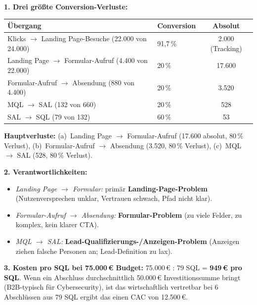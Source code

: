 \documentclass[11pt,a4paper,oneside]{article}
\begin{document}
\begin{loesungbox}
\textbf{1. Drei größte Conversion-Verluste:}

\smallskip
\begin{tabularx}{\linewidth}{@{}lXc@{}}
\toprule
\textbf{Übergang} & \textbf{Conversion} & \textbf{Absolut} \\
\midrule
Klicks $\rightarrow$ Landing Page-Besuche (22.000 von 24.000) & 91,7\,\% & \textendash{}2.000 (Tracking) \\
\midrule
Landing Page $\rightarrow$ Formular-Aufruf (4.400 von 22.000) & 20\,\% & \textendash{}17.600 \\
\midrule
Formular-Aufruf $\rightarrow$ Absendung (880 von 4.400)     & 20\,\% & \textendash{}3.520 \\
\midrule
MQL $\rightarrow$ SAL (132 von 660)                        & 20\,\% & \textendash{}528 \\
\midrule
SAL $\rightarrow$ SQL (79 von 132)                         & 60\,\% & \textendash{}53 \\
\bottomrule
\end{tabularx}

\smallskip
\textbf{Hauptverluste:} (a)~Landing Page $\rightarrow$ Formular-Aufruf (\textendash{}17.600 absolut, 80\,\% Verlust), (b)~Formular-Aufruf $\rightarrow$ Absendung (\textendash{}3.520, 80\,\% Verlust), (c)~MQL $\rightarrow$ SAL (\textendash{}528, 80\,\% Verlust).

\textbf{2. Verantwortlichkeiten:}
\begin{itemize}
  \item \emph{Landing Page $\rightarrow$ Formular:} primär \textbf{Landing-Page-Problem} (Nutzenversprechen unklar, Vertrauen schwach, Pfad nicht klar).
  \item \emph{Formular-Aufruf $\rightarrow$ Absendung:} \textbf{Formular-Problem} (zu viele Felder, zu komplex, kein klarer CTA).
  \item \emph{MQL $\rightarrow$ SAL:} \textbf{Lead-Qualifizierungs-/Anzeigen-Problem} (Anzeigen ziehen falsche Personen an; Lead-Definition zu lax).
\end{itemize}

\textbf{3. Kosten pro SQL bei 75.000\,\euro{} Budget:}
75.000\,\euro{} : 79 SQL = \textbf{949\,\euro{} pro SQL}. Wenn ein Abschluss durchschnittlich 50.000\,\euro{} Investitionssumme bringt (B2B-typisch für Cybersecurity), ist das wirtschaftlich vertretbar \textendash{} bei 6 Abschlüssen aus 79 SQL ergibt das einen CAC von 12.500\,\euro.


\end{loesungbox}
\end{document}

